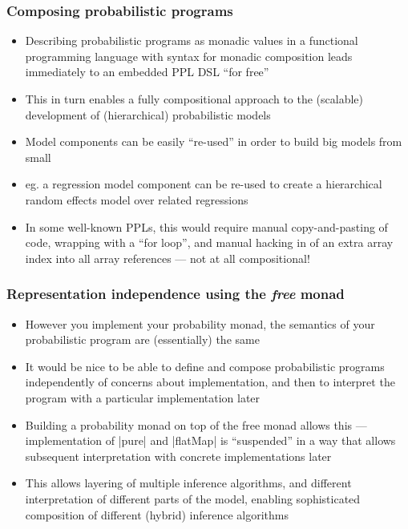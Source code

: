 \documentclass[mathserif,handout]{beamer}
\begin{document}
\begin{frame}
  \frametitle{Composing probabilistic programs}
  \begin{itemize}
  \item Describing probabilistic programs as \alert{monadic values} in a functional programming language with syntax for monadic composition leads immediately to an \alert{embedded PPL DSL} ``for free''
  \item This in turn enables a fully \alert{compositional} approach to the (scalable) development of (hierarchical) probabilistic models
  \item Model components can be easily ``re-used'' in order to build big models from small
  \item eg. a regression model component can be re-used to create a hierarchical random effects model over related regressions
    \item In some well-known PPLs, this would require manual copy-and-pasting of code, wrapping with a ``for loop'', and manual hacking in of an extra array index into all array references --- not at all compositional!
  \end{itemize}
\end{frame}


\begin{frame}[fragile]
  \frametitle{Representation independence using the \emph{free} monad}
  \begin{itemize}
  \item However you implement your probability monad, the semantics of your probabilistic program are (essentially) the same
  \item It would be nice to be able to define and compose probabilistic programs independently of concerns about implementation, and then to \alert{interpret} the program with a particular implementation later
  \item Building a probability monad on top of the \alert{free monad} allows this --- implementation of |pure| and |flatMap| is ``suspended'' in a way that allows subsequent interpretation with concrete implementations later
    \item This allows \alert{layering} of multiple inference algorithms, and different interpretation of different parts of the model, enabling sophisticated \alert{composition} of different (hybrid) inference algorithms
    \end{itemize}
\end{frame}
\end{document}
